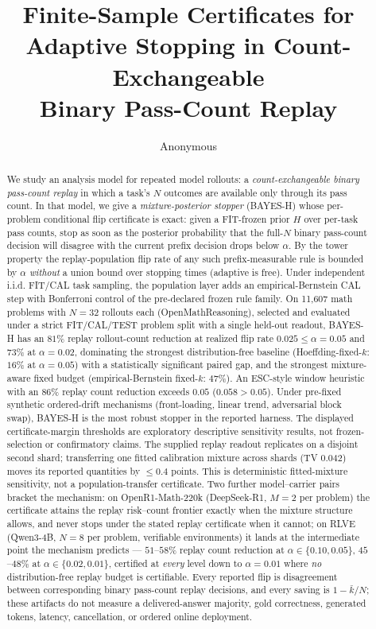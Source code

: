 \documentclass{article}
\title{Finite-Sample Certificates for\\
Adaptive Stopping in Count-Exchangeable\\
Binary Pass-Count Replay}
\author{Anonymous}
\date{}
\theoremstyle{definition}
\theoremstyle{remark}
\begin{document}
\maketitle

\begin{abstract}
We study an analysis model for repeated model rollouts: a
\emph{count-exchangeable binary pass-count replay} in which a task's $N$
outcomes are available only through its pass count.  In that model, we give a
\emph{mixture-posterior stopper} (BAYES-H) whose per-problem conditional flip
certificate is exact: given a FIT-frozen prior $H$ over per-task pass counts,
stop as soon as the posterior probability that the full-$N$ binary pass-count
decision will disagree with the current prefix decision drops below $\alpha$.
By the tower property the replay-population flip rate of any such
prefix-measurable rule is bounded by $\alpha$ \emph{without} a union bound over
stopping times (adaptive is free).  Under independent i.i.d. FIT/CAL task
sampling, the population layer adds an empirical-Bernstein CAL step with
Bonferroni control of the pre-declared frozen rule family.
On 11{,}607 math problems with $N=32$ rollouts each (OpenMathReasoning),
selected and evaluated under a strict FIT/CAL/TEST problem split with a single
held-out readout, BAYES-H has an $81\%$ replay rollout-count reduction at realized flip rate
$0.025\le\alpha=0.05$ and $73\%$ at $\alpha=0.02$, dominating the strongest
distribution-free baseline (Hoeffding-fixed-$k$: $16\%$ at $\alpha=0.05$) with
a statistically significant paired gap, and the strongest mixture-aware fixed
budget (empirical-Bernstein fixed-$k$: $47\%$). An ESC-style window heuristic
with an $86\%$ replay count reduction exceeds $0.05$ ($0.058>0.05$). Under
pre-fixed synthetic ordered-drift mechanisms (front-loading, linear trend,
adversarial block swap), BAYES-H is the most robust stopper in the reported
harness. The displayed certificate-margin thresholds are exploratory
descriptive sensitivity results, not frozen-selection or confirmatory claims.
The supplied replay readout replicates on a disjoint second shard; transferring
one fitted calibration mixture across shards (TV $0.042$) moves its reported
quantities by $\le0.4$ points. This is deterministic fitted-mixture sensitivity,
not a population-transfer certificate. Two further model--carrier pairs bracket the mechanism:
on OpenR1-Math-220k (DeepSeek-R1, $M=2$ per problem) the certificate attains
the replay risk--count frontier exactly when the mixture structure allows, and
never stops under the stated replay certificate when it cannot; on RLVE
(Qwen3-4B, $N=8$ per problem, verifiable environments) it
lands at the intermediate point the mechanism predicts --- $51$--$58\%$
replay count reduction at $\alpha\in\{0.10,0.05\}$, $45$--$48\%$ at
$\alpha\in\{0.02,0.01\}$, certified at \emph{every} level down to
$\alpha=0.01$ where \emph{no} distribution-free replay budget is certifiable.
Every reported flip is disagreement between corresponding binary pass-count
replay decisions, and every saving is $1-\bar k/N$; these artifacts do not
measure a delivered-answer majority, gold correctness, generated tokens,
latency, cancellation, or ordered online deployment.
\end{abstract}
\end{document}
